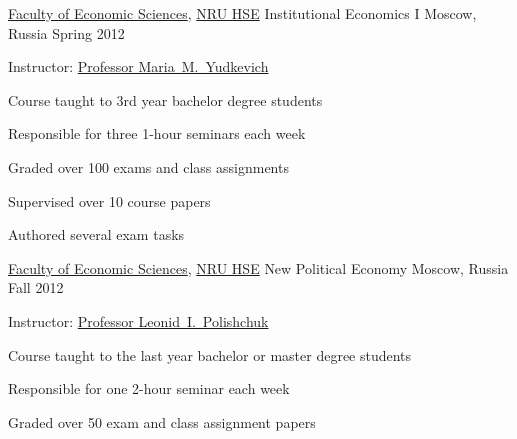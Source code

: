 \begin{cventries}
  \cventry
    {\href{https://economics.hse.ru/en/}{Faculty of Economic Sciences}, \href{http://www.hse.ru/en/}{NRU HSE}} %
    {Institutional Economics I} %
    {Moscow, Russia} %
    {Spring 2012} %
    {
      \begin{cvitems} %
        \item {Instructor: \href{https://www.hse.ru/en/staff/yudkevich}{Professor Maria~M.~Yudkevich}}
        \item {Course taught to 3rd year bachelor degree students}
        \item {Responsible for three 1-hour seminars each week}
        \item {Graded over 100 exams and class assignments}
        \item {Supervised over 10 course papers}
        \item {Authored several exam tasks}
      \end{cvitems}
    }

  \cventry
    {\href{https://economics.hse.ru/en/}{Faculty of Economic Sciences}, \href{http://www.hse.ru/en/}{NRU HSE}} %
    {New Political Economy} %
    {Moscow, Russia} %
    {Fall 2012} %
    {
      \begin{cvitems} %
        \item {Instructor: \href{http://www.hse.ru/en/org/persons/65104}{Professor Leonid~I.~Polishchuk}}
        \item {Course taught to the last year bachelor or master degree students}
        \item {Responsible for one 2-hour seminar each week}
        \item {Graded over 50 exam and class assignment papers}
      \end{cvitems}
    }

\end{cventries}
